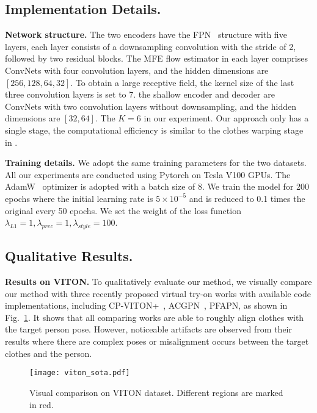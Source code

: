 \documentclass[runningheads]{llncs}
\begin{document}
 
\subsection{Implementation Details.} 
\textbf{Network structure.} The two encoders have the FPN~\cite{fpn} structure with five layers, each layer consists of a downsampling convolution with the stride of 2, followed by two residual blocks. The MFE flow estimator in each layer comprises ConvNets with four convolution layers, and the hidden dimensions are $[256,128,64,32]$. To obtain a large receptive field, the kernel size of the last three convolution layers is set to 7. the shallow encoder and decoder are ConvNets with two convolution layers without downsampling, and the hidden dimensions are $[32,64]$. The $K = 6$ in our experiment. Our approach only has a single stage, the computational efficiency is similar to the clothes warping stage in \cite{han2019clothflow,ge2021parser}. 

\textbf{Training details.} We adopt the same training parameters for the two datasets. All our experiments are conducted using Pytorch on Tesla V100 GPUs. The AdamW~\cite{loshchilov2017decoupled} optimizer is adopted with a batch size of 8. We train the model for 200 epochs where the initial learning rate is $5\times 10^{-5}$ and is reduced to 0.1 times the original every 50 epochs. We set the weight of the loss function $\lambda_{L1}=1, \lambda_{prec}=1, \lambda_{style}=100$.


\subsection{Qualitative Results.}
\textbf{Results on VITON.} To qualitatively evaluate our method, we visually compare our method with three recently proposed virtual try-on works with available code implementations, including CP-VITON+~\cite{cpvtonplus}, ACGPN~\cite{AGCPN}, PFAPN\cite{ge2021parser}, as shown in Fig.~\ref{viton}. It shows that all comparing works are able to roughly align clothes with the target person pose. However, noticeable artifacts are observed from their results where there are complex poses or misalignment occurs between the target clothes and the person.


 \begin{figure}[t]
\centering
\texttt{[image: viton\_sota.pdf]}

   \caption{Visual comparison on VITON dataset. Different regions are marked in red.\label{viton}}

\end{figure}
\end{document}
